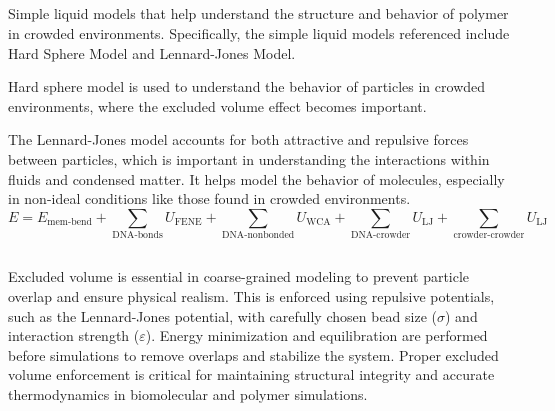 \documentclass[12pt]{article}
\begin{document}
\begin{flushleft}

    


\subsection*{}

       
Simple liquid models that help understand the structure and behavior of polymer in crowded environments. Specifically, the simple liquid models referenced include Hard Sphere Model and Lennard-Jones Model. 

Hard sphere model is used to understand the behavior of particles in crowded environments, where the excluded volume effect becomes important. 

The Lennard-Jones model accounts for both attractive and repulsive forces between particles, which is important in understanding the interactions within fluids and condensed matter. It helps model the behavior of molecules, especially in non-ideal conditions like those found in crowded environments.
\begin{equation}
E = E_{\text{mem-bend}}+\sum_{\text{DNA-bonds}} U_{\mathrm{FENE}} + \sum_{\text{DNA-nonbonded}} U_{\mathrm{WCA}} 
+ \sum_{\text{DNA-crowder}} U_{\mathrm{LJ}} 
+ \sum_{\text{crowder-crowder}} U_{\mathrm{LJ}}
\end{equation} 

  \subsection*{}
Excluded volume is essential in coarse-grained modeling to prevent particle overlap and ensure physical realism. This is enforced using repulsive potentials, such as the Lennard-Jones potential, with carefully chosen bead size ($\sigma$) and interaction strength ($\varepsilon$). Energy minimization and equilibration are performed before simulations to remove overlaps and stabilize the system. Proper excluded volume enforcement is critical for maintaining structural integrity and accurate thermodynamics in biomolecular and polymer simulations.


\end{flushleft}
\end{document}
